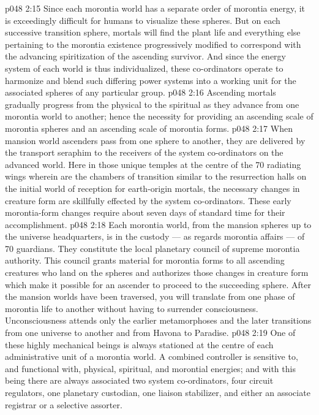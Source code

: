 \vs p048 2:15 \bibnobreakspace {} Since each morontia world has a separate order of morontia energy, it is exceedingly difficult for humans to visualize these spheres. But on each successive transition sphere, mortals will find the plant life and everything else pertaining to the morontia existence progressively modified to correspond with the advancing spiritization of the ascending survivor. And since the energy system of each world is thus individualized, these co\hyp{}ordinators operate to harmonize and blend such differing power systems into a working unit for the associated spheres of any particular group.
\vs p048 2:16 Ascending mortals gradually progress from the physical to the spiritual as they advance from one morontia world to another; hence the necessity for providing an ascending scale of morontia spheres and an ascending scale of morontia forms.
\vs p048 2:17 When mansion world ascenders pass from one sphere to another, they are delivered by the transport seraphim to the receivers of the system co\hyp{}ordinators on the advanced world. Here in those unique temples at the centre of the 70 radiating wings wherein are the chambers of transition similar to the resurrection halls on the initial world of reception for earth\hyp{}origin mortals, the necessary changes in creature form are skillfully effected by the system co\hyp{}ordinators. These early morontia\hyp{}form changes require about seven days of standard time for their accomplishment.
\vs p048 2:18 \bibnobreakspace {} Each morontia world, from the mansion spheres up to the universe headquarters, is in the custody --- as regards morontia affairs --- of 70 guardians. They constitute the local planetary council of supreme morontia authority. This council grants material for morontia forms to all ascending creatures who land on the spheres and authorizes those changes in creature form which make it possible for an ascender to proceed to the succeeding sphere. After the mansion worlds have been traversed, you will translate from one phase of morontia life to another without having to surrender consciousness. Unconsciousness attends only the earlier metamorphoses and the later transitions from one universe to another and from Havona to Paradise.
\vs p048 2:19 \bibnobreakspace {} One of these highly mechanical beings is always stationed at the centre of each administrative unit of a morontia world. A combined controller is sensitive to, and functional with, physical, spiritual, and morontial energies; and with this being there are always associated two system co\hyp{}ordinators, four circuit regulators, one planetary custodian, one liaison stabilizer, and either an associate registrar or a selective assorter.

